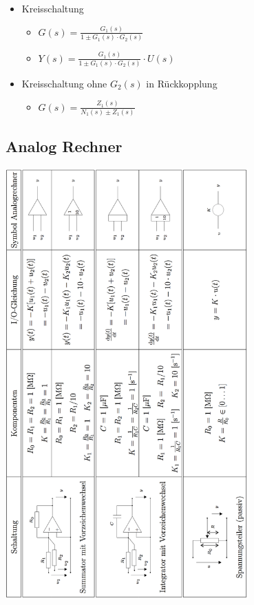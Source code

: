 \begin{multicols}{2}
\begin{itemize}
\item Kreisschaltung
\begin{itemize}
	\item $G(s) = \frac{G_1(s)}{1\pm G_1(s)\cdot G_2(s)}$
	\item $Y(s) = \frac{G_1(s)}{1\pm G_1(s)\cdot G_2(s)} \cdot U(s)$
\end{itemize}

\item Kreisschaltung ohne $G_2(s)$ in Rückkopplung
\begin{itemize}
	\item $G(s) = \frac{Z_1(s)}{N_1(s)\pm Z_1(s)}$
\end{itemize}

\end{itemize}
\end{multicols}

\subsection{Analog Rechner  }
	\begin{center}
	\includegraphics[width=0.7\textwidth]{./images/AnalogRechner}
	\end{center}

